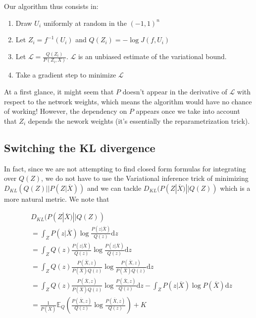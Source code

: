 \documentclass{article}
\begin{document}
Our algorithm thus consists in:

\begin{enumerate}
\item Draw \(U_i\) uniformly at random in the \((-1,1)^n\)
\item Let \(Z_i = f^{-1}(U_i)\) and \(Q(Z_i) = -\log J(f, U_i)\)
\item Let \(\mathcal{L} = \frac{Q(Z_i)}{P(Z_i, X)}\). \(\mathcal{L}\) is an
  unbiased estimate of the variational bound.
\item Take a gradient step to minimize \(\mathcal{L}\)
\end{enumerate}

At a first glance, it might seem that \(P\) doesn't appear in the derivative
of \(\mathcal{L}\) with respect to the network weights, which means the
algorithm would have no chance of working! However, the dependency on
\(P\) appears once we take into account that \(Z_i\) depends the nework weights
(it's essentially the reparametrization trick).


\subsection{Switching the KL divergence}

In fact, since we are not attempting to find closed form formulas for
integrating over \(Q(Z)\), we do not have to use the Variational inference
trick of minimizing \(D_{KL}(Q(Z)||P(Z|\overline{X}))\) and we can tackle
\(D_{KL}(P(Z|\overline{X})||Q(Z))\) which is a more natural metric. We note that

\[
\begin{aligned}
  & D_{KL}(P(Z|\overline{X})|| Q(Z)) \\
  &= \int_Z P(z|\overline{X}) \log \frac{P(z|\overline{X})}{Q(z)} \mathrm{d}z \\
  &= \int_Z Q(z) \frac{P(z|\overline{X})}{Q(z)} \log \frac{P(z|\overline{X})}{Q(z)}  \mathrm{d}z \\
  &= \int_Z Q(z) \frac{P(\overline{X}, z)}{P(\overline{X})Q(z)} \log \frac{P(\overline{X}, z)}{P(\overline{X})Q(z)}  \mathrm{d}z \\
  &= \int_Z Q(z) \frac{P(\overline{X}, z)}{P(\overline{X})Q(z)} \log \frac{P(\overline{X}, z)}{Q(z)}  \mathrm{d}z
  - \int_Z P(z|\overline{X}) \log P(\overline{X})  \mathrm{d}z \\
  &= \frac{1}{P(\overline{X})}\mathbb{E}_{Q} \left( \frac{P(\overline{X}, z)}{Q(z)} \log \frac{P(\overline{X}, z)}{Q(z)}\right) + K
\end{aligned}
\]
\end{document}
